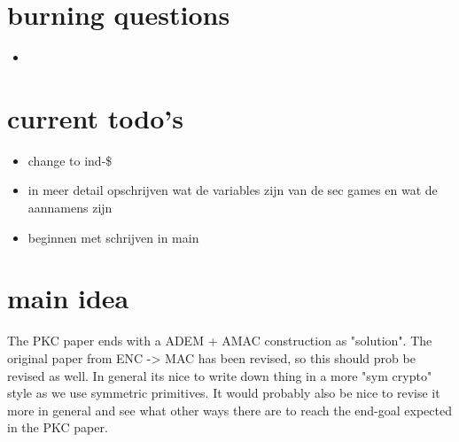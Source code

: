 \documentclass{article}
\begin{document}
\section{burning questions}
\begin{itemize}
   \item 
\end{itemize}

\newpage
\section{current todo's}
\begin{itemize}
    \item change to ind-\$
    \item in meer detail opschrijven wat de variables zijn van de sec games en wat de aannamens zijn
    \item beginnen met schrijven in main
\end{itemize}

\newpage
\section{main idea}
The PKC paper ends with a ADEM + AMAC construction as "solution". The original paper from ENC -> MAC has been revised, so this should prob be revised as well. In general its nice to write down thing in a more "sym crypto" style as we use symmetric primitives. It would probably also be nice to revise it more in general and see what other ways there are to reach the end-goal expected in the PKC paper.
\end{document}
